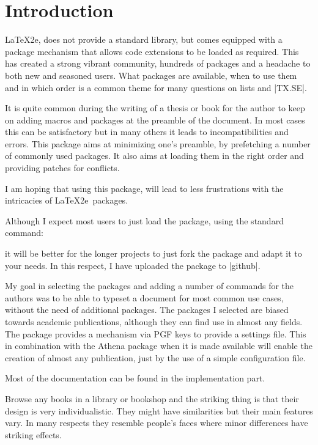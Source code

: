 \chapter{Introduction}

 \LaTeX2e, does not provide a standard library, but comes equipped with
 a package mechanism that allows code extensions to be loaded as required.
 This has created a strong vibrant community, hundreds of packages and a 
 headache to both new and seasoned users. What packages are available, when
 to use them and in which order is a common theme for many questions on
 lists and |TX.SE|.

 It is quite common during the writing of a thesis or book
 for the author to keep on adding macros and packages
 at the preamble of the document. In most cases this can
 be satisfactory but in many others it leads to
 incompatibilities and errors. This package aims at
 minimizing one's preamble, by prefetching a number of
 commonly used packages. It also aims at loading them
 in the right order and providing patches for conflicts.
 
 I am hoping that using this package, will lead to less
 frustrations with the intricacies of \LaTeX2e\ packages.

 Although I expect most users to just load the package, using
 the standard command:

 \begin{teX}
  \usepackage{phd}
 \end{teX}

 it will be better for the longer projects to just fork the
 package and adapt it to your needs. In this respect, I have
 uploaded the package to |github|.

 My goal in selecting the packages and adding a number of 
 commands for the authors was to be able to typeset a 
 document for most common use cases, without the need of
 additional packages. The packages I selected are biased
 towards academic publications, although they can find use
 in almost any fields. The package provides a mechanism via
 PGF keys to provide a settings file. This in combination
 with the Athena package when it is made available will
 enable the creation of almost any publication, just by
 the use of a simple configuration file.
 
 Most of the documentation can be found in the implementation part.

Browse any books in a library or bookshop and the striking thing is that their design is very individualistic. They might have similarities but their main features vary. In many respects they resemble people's faces where minor differences have striking effects.


